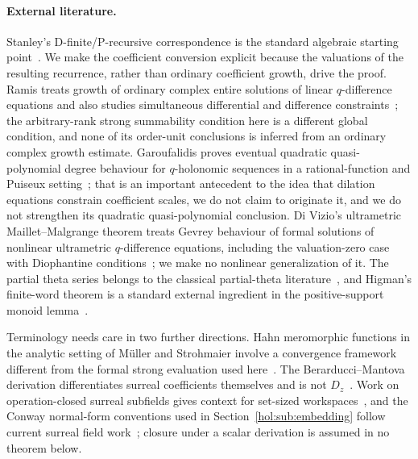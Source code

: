 \documentclass[11pt]{article}
\numberwithin{equation}{section}
\theoremstyle{definition}
\theoremstyle{remark}
\begin{document}
\paragraph{External literature.}
Stanley's D-finite/P-recursive correspondence is the standard algebraic
starting point~\cite{stanley}. We make the coefficient conversion explicit
because the valuations of the resulting recurrence, rather than ordinary
coefficient growth, drive the proof. Ramis treats growth of ordinary complex
entire solutions of linear $q$-difference equations and also studies
simultaneous differential and difference constraints~\cite{ramis}; the
arbitrary-rank strong summability condition here is a different global
condition, and none of its order-unit conclusions is inferred from an ordinary
complex growth estimate. Garoufalidis proves eventual quadratic
quasi-polynomial degree behaviour for $q$-holonomic sequences in a
rational-function and Puiseux setting~\cite{garoufalidis}; that is an
important antecedent to the idea that dilation equations constrain coefficient
scales, we do not claim to originate it, and we do not strengthen its
quadratic quasi-polynomial conclusion. Di Vizio's ultrametric
Maillet--Malgrange theorem treats Gevrey behaviour of formal solutions of
nonlinear ultrametric $q$-difference equations, including the valuation-zero
case with Diophantine conditions~\cite{divizio}; we make no nonlinear
generalization of it. The partial theta series belongs to the classical
partial-theta literature~\cite{andrewswarnaar}, and Higman's finite-word
theorem is a standard external ingredient in the positive-support monoid
lemma~\cite{higman}.

Terminology needs care in two further directions. Hahn meromorphic functions
in the analytic setting of M\"uller and Strohmaier involve a convergence
framework different from the formal strong evaluation used
here~\cite{mueller}. The Berarducci--Mantova derivation differentiates surreal
coefficients themselves and is not $D_z$~\cite{bm}. Work on operation-closed
surreal subfields gives context for set-sized workspaces~\cite{bg}, and the
Conway normal-form conventions used in Section~\ref{hol:sub:embedding} follow
current surreal field work~\cite{kks}; closure under a scalar derivation is
assumed in no theorem below.
\end{document}
